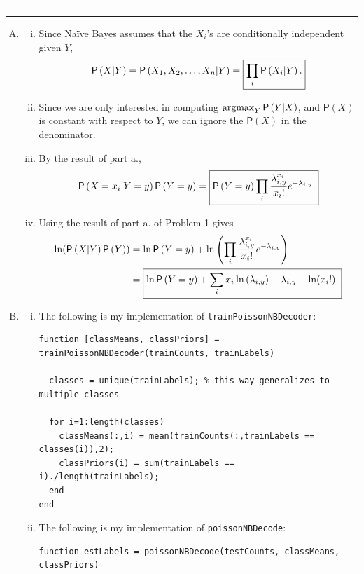 \documentclass[11pt]{article}
\newcounter{questionCounter}
\newcounter{partCounter}[questionCounter]
\newenvironment{question}[2][\arabic{questionCounter}]{%
    \setcounter{partCounter}{0}%
    \vspace{.25in} \hrule \vspace{0.5em}%
        \noindent{\bf #2}%
    \vspace{0.8em} \hrule \vspace{.10in}%
    \addtocounter{questionCounter}{1}%
}{}
\newcommand{\ans}[1]{\mbox{\fbox{$\displaystyle #1$}}} %
\newcommand{\pr}[1]{\mathsf{P}\left( #1 \right)} %
\newcommand{\argmax}{\operatornamewithlimits{argmax}}
\begin{document}
\begin{question}{Problem 3}
\begin{enumerate}[A)]
\item
\begin{enumerate}[i)]
\item Since Na\"ive Bayes assumes that the $X_i$'s are conditionally
independent given $Y$,
\[\pr{X | Y} = \pr{X_1,X_2,\dots,X_n | Y} = \ans{\prod_i \pr{X_i | Y}.}\]

\item Since we are only interested in computing $\argmax_Y \pr{Y | X}$, and
$\pr{X}$ is constant with respect to $Y$, we can ignore the $\pr{X}$ in the
denominator.

\item By the result of part a.,
\[\pr{X = x_i | Y = y} \pr{Y = y}
 = \ans{\pr{Y = y} \prod_i \frac{\lambda_{i,y}^{x_i}}{x_i!}e^{-\lambda_{i,y}}.}
\]

\item Using the result of part a. of Problem 1 gives
\begin{align*}
\ln (\pr{X | Y} \pr{Y})
 & = \ln \pr{Y = y} + \ln \left( \prod_i \frac{\lambda_{i,y}^{x_i}}{x_i!}e^{-\lambda_{i,y}} \right) \\
 & = \ans{\ln \pr{Y = y} + \sum_i x_i \ln \left( \lambda_{i,y} \right) - \lambda_{i,y} - \ln(x_i!).}
\end{align*}
\end{enumerate}

\item
\begin{enumerate}[i)]
\item The following is my implementation of \texttt{trainPoissonNBDecoder}:
{\footnotesize
\begin{verbatim}
function [classMeans, classPriors] = trainPoissonNBDecoder(trainCounts, trainLabels)

  classes = unique(trainLabels); % this way generalizes to multiple classes

  for i=1:length(classes)
    classMeans(:,i) = mean(trainCounts(:,trainLabels ==  classes(i)),2);
    classPriors(i) = sum(trainLabels == i)./length(trainLabels);
  end
end
\end{verbatim}
}

\item The following is my implementation of \texttt{poissonNBDecode}:
{\footnotesize
\begin{verbatim}
function estLabels = poissonNBDecode(testCounts, classMeans, classPriors)


\end{verbatim}}
\end{enumerate}
\end{enumerate}
\end{question}
\end{document}
